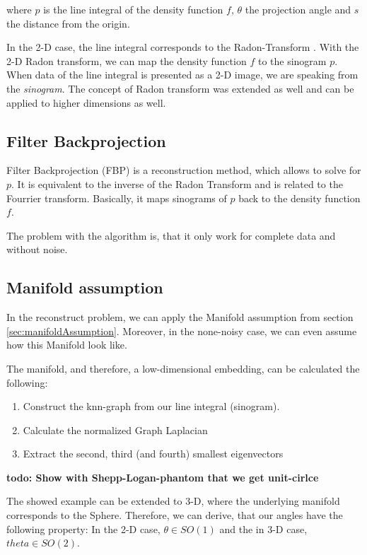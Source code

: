 where $p$ is the line integral of the density function $f$, $\theta$ the projection angle and $s$ the distance from the origin.

In the 2-D case, the line integral corresponds to the Radon-Transform \cite{radonTransform}.
With the 2-D Radon transform, we can map the density function $f$ to the sinogram $p$. 
When data of the line integral is presented as a 2-D image, we are speaking from the \textit{sinogram}.
The concept of Radon transform was extended as well and can be applied to higher dimensions as well.

\subsection{Filter Backprojection}
Filter Backprojection (FBP) is a reconstruction method, which allows to solve for $p$. It is equivalent to the inverse of the Radon Transform
and is related to the Fourrier transform. Basically, it maps sinograms of $p$ back to the density function $f$.

The problem with the algorithm is, that it only work for complete data and without noise.

\subsection{Manifold assumption}
In the reconstruct problem, we can apply the Manifold assumption from section \ref{sec:manifoldAssumption}.
Moreover, in the none-noisy case, we can even assume how this Manifold look like.

The manifold, and therefore, a low-dimensional embedding, can be calculated the following:

\begin{enumerate}
    \item Construct the knn-graph from our line integral (sinogram).
    \item Calculate the normalized Graph Laplacian
    \item Extract the second, third (and fourth) smallest eigenvectors
\end{enumerate}

\textbf{todo: Show with Shepp-Logan-phantom that we get unit-cirlce}

The showed example can be extended to 3-D, where the underlying manifold corresponds to the Sphere.
Therefore, we can derive, that our angles have the following property:
In the 2-D case, $\theta \in SO(1)$ and the in 3-D case, $theta \in SO(2)$.

